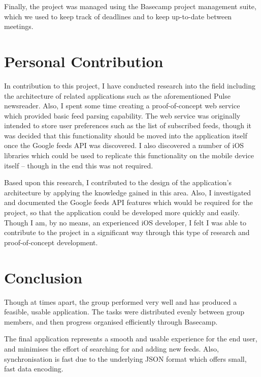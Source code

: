 \documentclass[a4paper,11pt]{article}
\begin{document}
    Finally, the project was managed using the Basecamp project management
    suite, which we used to keep track of deadlines and to keep up-to-date
    between meetings.

    \section{Personal Contribution}

    In contribution to this project, I have conducted research into the field
    including the architecture of related applications such as the
    aforementioned Pulse newsreader. Also, I spent some time creating
    a proof-of-concept web service which provided basic feed parsing
    capability. The web service was originally intended to store user
    preferences such as the list of subscribed feeds, though it was decided
    that this functionality should be moved into the application itself once
    the Google feeds API was discovered. I also discovered a number of iOS
    libraries which could be used to replicate this functionality on the mobile
    device itself – though in the end this was not required.

    Based upon this research, I contributed to the design of the application's
    architecture by applying the knowledge gained in this area. Also,
    I investigated and documented the Google feeds API features which would be
    required for the project, so that the application could be developed more
    quickly and easily. Though I am, by no means, an experienced iOS developer,
    I felt I was able to contribute to the project in a significant way through
    this type of research and proof-of-concept development.

    \section{Conclusion}

    Though at times apart, the group performed very well and has produced
    a feasible, usable application. The tasks were distributed evenly between
    group members, and then progress organised efficiently through Basecamp.

    The final application represents a smooth and usable experience for the end
    user, and minimises the effort of searching for and adding new feeds. Also,
    synchronisation is fast due to the underlying JSON format which offers
    small, fast data encoding.
\end{document}
